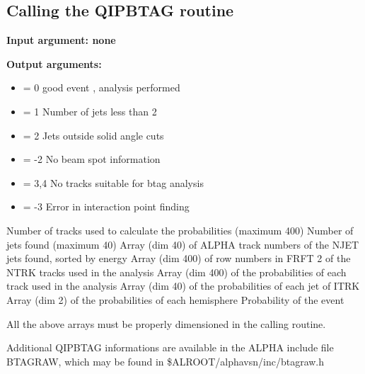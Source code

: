\subsection{\label{sec-QIPBCC}Calling the QIPBTAG routine}
\par
{}
\par
{\bf Input argument: none}
\par
{\bf Output arguments:}
\begin{indentlist}{ 3.50cm}{ 3.75cm}
\begin{itemize}
\item     = 0   good event , analysis performed
\item     = 1   Number of jets less than 2
\item     = 2   Jets outside solid angle cuts
\item     = -2  No beam spot information
\item     = 3,4 No tracks suitable for btag analysis
\item     = -3  Error in interaction point finding
\end{itemize}
Number of tracks used to calculate the probabilities (maximum 400)
Number of jets found (maximum 40)
Array (dim 40) of ALPHA track numbers of the NJET jets found,
sorted by energy
Array (dim 400) of row numbers in FRFT 2 of the NTRK tracks
used in the analysis
Array (dim 400) of the probabilities of each track used in the analysis
Array (dim 40) of the probabilities of each jet of ITRK
Array (dim 2) of the probabilities of each hemisphere
Probability of the event
\end{indentlist}
\par
All the above arrays must be properly dimensioned in the calling routine.
\par
Additional QIPBTAG informations are available in the ALPHA include file BTAGRAW, which may be found in
\$ALROOT/alphavsn/inc/btagraw.h
\par

